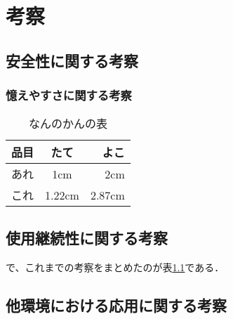 \chapter{考察}\label{chap:discussion}

\section{安全性に関する考察}\label{sec:disc1}

\subsection{憶えやすさに関する考察}\label{subsec:disc2}

\begin{table}[th]
\begin{center}
\caption{なんのかんの表}
\label{tbl:hyou}
\vspace{4mm}
\begin{tabular}{l||c|r}
\hline
品目 & たて & よこ \\
\hline \hline
あれ & 1cm & 2cm \\
これ & 1.22cm & 2.87cm \\
\hline
\end{tabular}
\end{center}
\end{table}

\section{使用継続性に関する考察}\label{sec:disc3}
で、これまでの考察をまとめたのが表\ref{tbl:hyou}である．

\section{他環境における応用に関する考察}\label{sec:disc4}

\newpage

